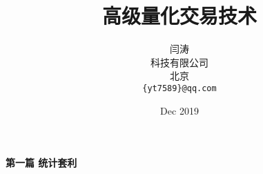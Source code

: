 \documentclass[UTF8]{article}
\title{高级量化交易技术}
\author{
  闫涛 \\
  科技有限公司\\
  北京 \\
  \texttt{\{yt7589\}@qq.com} \\
}
\date{Dec 2019}
\begin{document}
\newpage
\maketitle
\begin{center}
\quad \newline \quad \newline \quad \newline \quad \newline \quad \newline \quad \newline \quad \newline \quad \newline \quad \newline \quad \newline
\quad \newline \quad \newline \quad \newline \quad \newline \quad \newline \quad \newline \quad \newline \quad \newline \quad \newline \quad \newline
\quad \newline \quad \newline \quad \newline \quad \newline \quad \newline \quad \newline \quad \newline \quad \newline \quad \newline \quad \newline
\quad \newline \quad \newline \quad \newline
\Large \textbf{第一篇 统计套利} \quad \textbf{}
\end{center}








\end{document}
